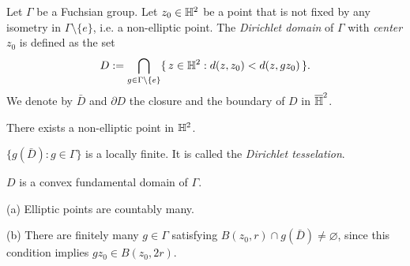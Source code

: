 \documentclass[12pt]{article}
\begin{document}
\begin{prb}
Let $\Gamma$ be a Fuchsian group.
Let $z_0\in\mathbb{H}^2$ be a point that is not fixed by any isometry in $\Gamma\setminus\{e\}$, i.e. a non-elliptic point.
The \emph{Dirichlet domain} of $\Gamma$ with \emph{center} $z_0$ is defined as the set
\[D:=\bigcap_{g\in\Gamma\setminus\{e\}}\{\,z\in\mathbb{H}^2:d(z,z_0)<d(z,gz_0)\,\}.\]
We denote by $\bar D$ and $\partial D$ the closure and the boundary of $D$ in $\overline{\mathbb{H}}^2$.
\begin{parts}
\item There exists a non-elliptic point in $\mathbb{H}^2$.
\item $\{g(\bar D):g\in\Gamma\}$ is a locally finite. It is called the \emph{Dirichlet tesselation}.
\item $D$ is a convex fundamental domain of $\Gamma$.
\end{parts}
\end{prb}
\begin{pf}
(a)
Elliptic points are countably many.

(b)
There are finitely many $g\in\Gamma$ satisfying $B(z_0,r)\cap g(\bar D)\ne\varnothing$, since this condition implies $gz_0\in B(z_0,2r)$.
\end{pf}
\end{document}
